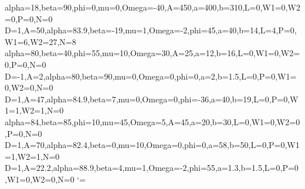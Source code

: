 %
  {alpha=18,beta=90,phi=0,mu=0,Omega=-40,A=450,a=400,b=310,L=0,W1=0,W2=0,P=0,N=0}
%
  {D=1,A=50,alpha=83.9,beta=-19,mu=1,Omega=-2,phi=45,a=40,b=14,L=4,P=0,W1=6,W2=27,N=8}
%
  {alpha=80,beta=40,phi=55,mu=10,Omega=30,A=25,a=12,b=16,L=0,W1=0,W2=0,P=0,N=0}
%
  {D=-1,A=2,alpha=80,beta=90,mu=0,Omega=0,phi=0,a=2,b=1.5,L=0,P=0,W1=0,W2=0,N=0}
%
  {D=1,A=47,alpha=84.9,beta=7,mu=0,Omega=0,phi=-36,a=40,b=19,L=0,P=0,W1=1,W2=1,N=0}
%
  {alpha=84,beta=85,phi=10,mu=45,Omega=5,A=45,a=20,b=30,L=0,W1=0,W2=0,P=0,N=0}
%
  {D=1,A=70,alpha=82.4,beta=0,mu=10,Omega=0,phi=0,a=58,b=50,L=0,P=0,W1=1,W2=1,N=0}
%
  {D=1,A=22.2,alpha=88.9,beta=4,mu=1,Omega=-2,phi=55,a=1.3,b=1.5,L=0,P=0,W1=0,W2=0,N=0}
%
%
\def\psShell{\pst@object{psShell}}
\def\psShell@i{\@ifnextchar(\psShell@ii{\psShell@ii(0,0,0)}}
\def\psShell@ii(#1){%
  \begin@SpecialObj
  \if$\pst@solides@file$  %
    \addto@pscode{ tx@ShellDict begin \pst@shell@variables }%
    \defFunction{pst@coquillage}(uu,vu){xShell}{yShell}{zShell}
    \psSolid[object=surfaceparametree,function=pst@coquillage](#1)
    \showpointsfalse
    \addto@pscode{ end }%
  \else
    \ifPst@writedata
      \psSolid[action=writesolid](#1)%
    \else
      \psSolid[object=datfile](#1)%
    \fi
  \fi
  \end@SpecialObj
  \ignorespaces}%
%
\catcode`\@=\TheAtCode\relax
%
\endinput 
